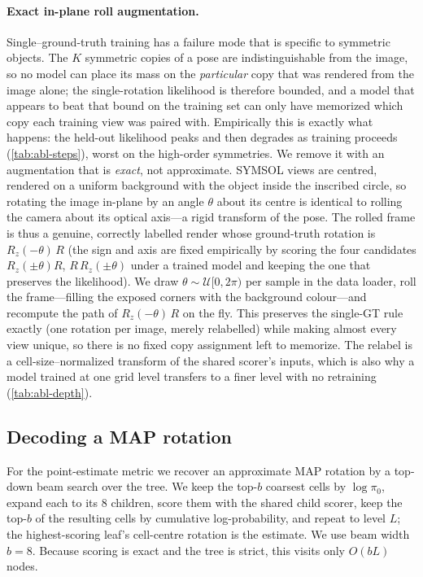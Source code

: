 \paragraph{Exact in-plane roll augmentation.}
\label{sec:aug}
Single--ground-truth training has a failure mode that is specific to symmetric
objects. The $K$ symmetric copies of a pose are indistinguishable from the image,
so no model can place its mass on the \emph{particular} copy that was rendered
from the image alone; the single-rotation likelihood is therefore bounded, and a
model that appears to beat that bound on the training set can only have memorized
which copy each training view was paired with. Empirically this is exactly what
happens: the held-out likelihood peaks and then degrades as training proceeds
(\cref{tab:abl-steps}), worst on the high-order symmetries.
We remove it with an augmentation that is \emph{exact}, not approximate. SYMSOL
views are centred, rendered on a uniform background with the object inside the
inscribed circle, so rotating the image in-plane by an angle $\theta$ about its
centre is identical to rolling the camera about its optical axis---a rigid
transform of the pose. The rolled frame is thus a genuine, correctly labelled
render whose ground-truth rotation is $R_z(-\theta)\,R$ (the sign and axis are
fixed empirically by scoring the four candidates $R_z(\pm\theta)R$,
$R\,R_z(\pm\theta)$ under a trained model and keeping the one that preserves the
likelihood). We draw $\theta\sim\mathcal{U}[0,2\pi)$ per sample in the data
loader, roll the frame---filling the exposed corners with the background
colour---and recompute the path of $R_z(-\theta)\,R$ on the fly. This preserves
the single-GT rule exactly (one rotation per image, merely relabelled) while
making almost every view unique, so there is no fixed copy assignment left to
memorize. The relabel is a cell-size--normalized transform of the shared
scorer's inputs, which is also why a model trained at one grid level transfers to
a finer level with no retraining (\cref{tab:abl-depth}).

\subsection{Decoding a MAP rotation}
\label{sec:decode}

For the point-estimate metric we recover an approximate MAP rotation by a
top-down beam search over the tree. We keep the top-$b$ coarsest cells by
$\log\pi_0$, expand each to its $8$ children, score them with the shared child
scorer, keep the top-$b$ of the resulting cells by cumulative log-probability,
and repeat to level $L$; the highest-scoring leaf's cell-centre rotation is the
estimate. We use beam width $b=8$. Because scoring is exact and the tree is
strict, this visits only $O(bL)$ nodes.

